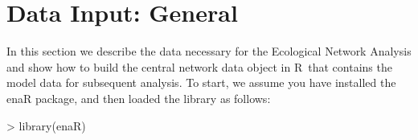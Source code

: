 \documentclass[11pt]{article}
\def\R{\textsf{R}}
\begin{document}

\section{Data Input: General}
In this section we describe the data necessary for the Ecological
Network Analysis and show how to build the central network data object
in \R\ that contains the model data for subsequent analysis.  To
start, we assume you have installed the enaR package, and then loaded
the library as follows:


\begin{Schunk}
\begin{Sinput}
> library(enaR)
\end{Sinput}
\end{Schunk}
\end{document}
